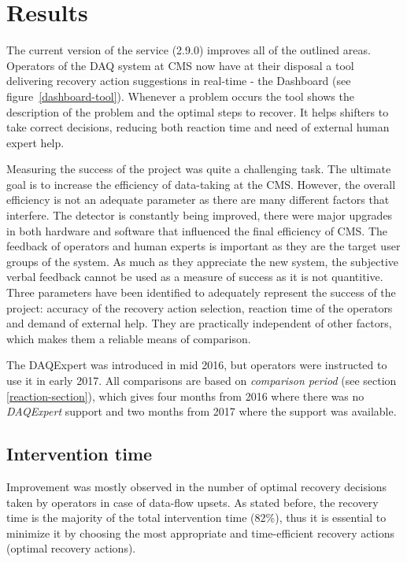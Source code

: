 \documentclass[a4paper]{jpconf}
\begin{document}
\section{Results}

The current version of the service (2.9.0) improves all of the outlined areas. Operators of the DAQ system at CMS now have at their disposal a tool delivering recovery action suggestions in real-time - the Dashboard (see figure~\ref{dashboard-tool}). Whenever a problem occurs the tool shows the description of the problem and the optimal steps to recover. It helps shifters to take correct decisions, reducing both reaction time and need of external human expert help.

Measuring the success of the project was quite a challenging task. The ultimate goal is to increase the efficiency of data-taking at the CMS. However, the overall efficiency is not an adequate parameter as there are many different factors that interfere. The detector is constantly being improved, there were major upgrades in both hardware and software that influenced the final efficiency of CMS. The feedback of operators and human experts is important as they are the target user groups of the system. As much as they appreciate the new system, the subjective verbal feedback cannot be used as a measure of success as it is not quantitive. Three parameters have been identified to adequately represent the success of the project: accuracy of the recovery action selection, reaction time of the operators and demand of external help. They are practically independent of other factors, which makes them a reliable means of comparison.

The DAQExpert was introduced in mid 2016, but operators were instructed to use it in early 2017. All comparisons are based on {\it comparison period} (see section \ref{reaction-section}), which gives four months from 2016 where there was no {\it DAQExpert} support and two months from 2017 where the support was available. 


\subsection{Intervention time}

Improvement was mostly observed in the number of optimal recovery decisions taken by operators in case of data-flow upsets. As stated before, the recovery time is the majority of the total intervention time (82\%), thus it is essential to minimize it by choosing the most appropriate and time-efficient recovery actions (optimal recovery actions). 
\end{document}
